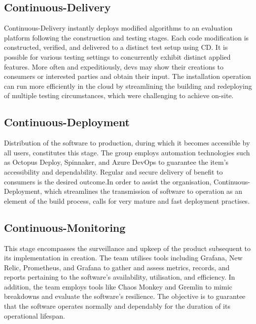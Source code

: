 \documentclass[12pt, letterpaper]{article}
\begin{document}
\subsection{Continuous-Delivery}
Continuous-Delivery instantly deploys modified algorithms to an evaluation platform following the construction and testing stages. Each code modification is constructed, verified, and delivered to a distinct test setup using CD. It is possible for various testing settings to concurrently exhibit distinct applied features. More often and expeditiously, devs may show their creations to consumers or interested parties and obtain their input. The installation operation can run more efficiently in the cloud by streamlining the building and redeploying of multiple testing circumstances, which were challenging to achieve on-site\cite{Pallis}.

\subsection{Continuous-Deployment}
Distribution of the software to production, during which it becomes accessible by all users, constitutes this stage. The group employs automation technologies such as Octopus Deploy, Spinnaker, and Azure DevOps to guarantee the item's accessibility and dependability. Regular and secure delivery of benefit to consumers is the desired outcome.In order to assist the organisation, Continuous-Deployment, which streamlines the transmission of software to operation as an element of the build process, calls for very mature and fast deployment practises\cite{Zhu}.

\subsection{Continuous-Monitoring}
This stage encompasses the surveillance and upkeep of the product subsequent to its implementation in creation. The team utilises tools including Grafana, New Relic, Prometheus, and Grafana to gather and assess metrics, records, and reports pertaining to the software's availability, utilisation, and efficiency. In addition, the team employs tools like Chaos Monkey and Gremlin to mimic breakdowns and evaluate the software's resilience. The objective is to guarantee that the software operates normally and dependably for the duration of its operational lifespan\cite{senapathi2018devops}.   
\end{document}

